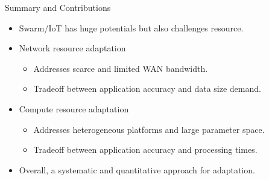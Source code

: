 \begin{frame}{Summary and Contributions}
  \begin{itemize}
  \item Swarm/IoT has huge potentials but also challenges resource.
  \item Network resource adaptation
    \begin{itemize}
    \item Addresses scarce and limited WAN bandwidth.
    \item Tradeoff between application accuracy and data size demand.
    \end{itemize}
  \item Compute resource adaptation
    \begin{itemize}
    \item Addresses heterogeneous platforms and large parameter space.
    \item Tradeoff between application accuracy and processing times.
    \end{itemize}
  \item Overall, a systematic and quantitative approach for adaptation.
  \end{itemize}
\end{frame}

